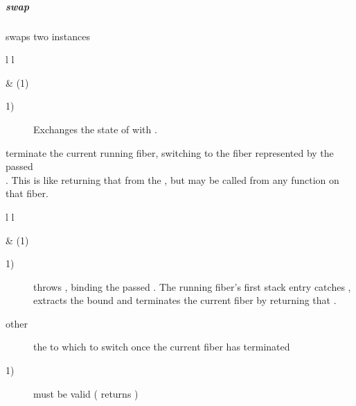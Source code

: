 \subparagraph*{swap}
swaps two \fiber instances\\

\begin{tabular}{ l l }
    \midrule

     & (1)\\

    \midrule
\end{tabular}

\begin{description}
    \item[1)] Exchanges the state of  with .\\
\end{description}



terminate the current running fiber, switching to the fiber represented by
the passed\\\fiber. This is like returning that \fiber from the \entryfn, but may
be called from any function on that fiber.\\

\begin{tabular}{ l l }
    \midrule

     & (1)\\

    \midrule
\end{tabular}

\begin{description}
    \item[1)] throws \unwindex, binding the passed \fiber. The running fiber's
              first stack entry catches \unwindex, extracts the bound \fiber
              and terminates the current fiber by returning that \fiber.
\end{description}

\begin{description}
    \item[other] the \fiber to which to switch once the current fiber has terminated
\end{description}

\begin{description}
    \item[1)]  must be valid ( returns )
\end{description}

